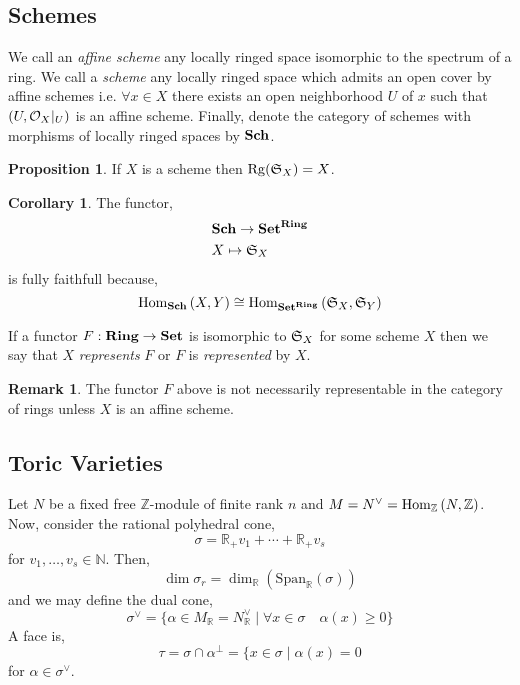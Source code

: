 \documentclass[12pt]{extarticle}
\newcommand{\Z}{\mathbb{Z}}
\newcommand{\R}{\mathbb{R}}
\newcommand{\N}{\mathbb{N}}
\newcommand{\Set}{\mathbf{Set}}
\theoremstyle{definition}
\newtheorem{proposition}[theorem]{Proposition}
\newtheorem{corollary}[theorem]{Corollary}
\newtheorem{remark}{Remark}
\newenvironment{definition}[1][Definition:]{\begin{trivlist}
\item[\hskip \labelsep {\bfseries #1}]}{\end{trivlist}}
\begin{document}
\subsection{Schemes}

\begin{definition}
We call an \textit{affine scheme} any locally ringed space isomorphic to the spectrum of a ring. We call a \textit{scheme} any locally ringed space which admits an open cover by affine schemes i.e. $\forall x \in X$ there exists an open neighborhood $U$ of $x$ such that $(U, \mathcal{O}_{X}|_U)$ is an affine scheme. Finally, denote the category of schemes with morphisms of locally ringed spaces by $\mathbf{Sch}$. 
\end{definition}

\begin{proposition}
If $X$ is a scheme then $\mathrm{Rg}(\mathfrak{S}_X) = X$. 
\end{proposition}

\begin{corollary}
The functor,
\begin{align*}
& \Sch \to \Set^{\Ring}
\\
& X \mapsto \Sf_X
\end{align*}
is fully faithfull because,
\[ \Homover{\Sch}{X}{Y} \cong \Homover{\Set^\Ring}{\Sf_X}{\Sf_Y} \]
\end{corollary}

\begin{definition}
If a functor $F : \Ring \to \Set$ is isomorphic to $\mathfrak{S}_X$ for some scheme $X$ then we say that $X$ \textit{represents} $F$ or $F$ is \textit{represented} by $X$.
\end{definition}

\begin{remark}
The functor $F$ above is not necessarily representable in the category of rings unless $X$ is an affine scheme. 
\end{remark}

\subsection{Toric Varieties}

Let $N$ be a fixed free $\Z$-module of finite rank $n$ and $M = N^\vee = \Homover{\Z}{N}{\Z}$. Now, consider the rational polyhedral cone,
\[ \sigma = \R_+ v_1 + \cdots + \R_{+} v_s \]
for $v_1, \dots, v_s \in \N$. Then,
\[ \dim{\sigma_r} = \dim_{\R}(\mathrm{Span}_{\R}(\sigma)) \]
and we may define the dual cone,
\[ \sigma^\vee = \{ \alpha \in M_\R = N_\R^\vee \mid \forall x \in \sigma \quad \alpha(x) \ge 0 \} \]
A face is,
\[ \tau = \sigma \cap \alpha^\perp = \{ x \in \sigma \mid \alpha(x) = 0 \]
for $\alpha \in \sigma^\vee$.
\end{document}
